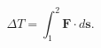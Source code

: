 \documentclass[12pt,preview]{standalone}
\newcommand{\FLPvec}[1]{\boldsymbol{#1}}
\newcommand{\FLPF}{\FLPvec{F}}
\newcommand{\FLPs}{\FLPvec{s}}
\begin{document}
\begin{preview}
\begin{equation}
    \label{Eq:I:13:9}
    \Delta T=\int_1^2\FLPF\cdot d\FLPs.
\end{equation}
\end{preview}
\end{document}
